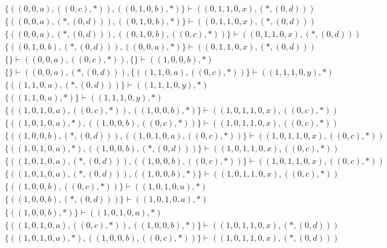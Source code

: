 \begin{align*}
	 & \qquad \{ ((0, 0, a), ((0, c), *)), ((0, 1, 0, b), *) \} \vdash ((0, 1, 1, 0, x), (*, (0, d))) \\ 
	 & \qquad \{ ((0, 0, a), (*, (0, d))), ((0, 1, 0, b), *) \} \vdash ((0, 1, 1, 0, x), (*, (0, d))) \\ 
	 & \qquad \{ ((0, 0, a), (*, (0, d))), ((0, 1, 0, b), ((0, c), *)) \} \vdash ((0, 1, 1, 0, x), (*, (0, d))) \\ 
	 & \qquad \{ ((0, 1, 0, b), (*, (0, d))), ((0, 0, a), *) \} \vdash ((0, 1, 1, 0, x), (*, (0, d))) \\ 
	 & \qquad \{  \} \vdash ((0, 0, a), ((0, c), *)), \{  \} \vdash ((1, 0, 0, b), *) \\ 
	 & \qquad \{  \} \vdash ((0, 0, a), (*, (0, d))), \{ ((1, 1, 0, a), ((0, c), *)) \} \vdash ((1, 1, 1, 0, y), *) \\ 
	 & \qquad \{ ((1, 1, 0, a), (*, (0, d))) \} \vdash ((1, 1, 1, 0, y), *) \\ 
	 & \qquad \{ ((1, 1, 0, a), *) \} \vdash ((1, 1, 1, 0, y), *) \\ 
	 & \qquad \{ ((1, 0, 1, 0, a), ((0, c), *)), ((1, 0, 0, b), *) \} \vdash ((1, 0, 1, 1, 0, x), ((0, c), *)) \\ 
	 & \qquad \{ ((1, 0, 1, 0, a), *), ((1, 0, 0, b), ((0, c), *)) \} \vdash ((1, 0, 1, 1, 0, x), ((0, c), *)) \\ 
	 & \qquad \{ ((1, 0, 0, b), (*, (0, d))), ((1, 0, 1, 0, a), ((0, c), *)) \} \vdash ((1, 0, 1, 1, 0, x), ((0, c), *)) \\ 
	 & \qquad \{ ((1, 0, 1, 0, a), *), ((1, 0, 0, b), (*, (0, d))) \} \vdash ((1, 0, 1, 1, 0, x), ((0, c), *)) \\ 
	 & \qquad \{ ((1, 0, 1, 0, a), (*, (0, d))), ((1, 0, 0, b), ((0, c), *)) \} \vdash ((1, 0, 1, 1, 0, x), ((0, c), *)) \\ 
	 & \qquad \{ ((1, 0, 1, 0, a), (*, (0, d))), ((1, 0, 0, b), *) \} \vdash ((1, 0, 1, 1, 0, x), ((0, c), *)) \\ 
	 & \qquad \{ ((1, 0, 0, b), ((0, c), *)) \} \vdash ((1, 0, 1, 0, a), *) \\ 
	 & \qquad \{ ((1, 0, 0, b), (*, (0, d))) \} \vdash ((1, 0, 1, 0, a), *) \\ 
	 & \qquad \{ ((1, 0, 0, b), *) \} \vdash ((1, 0, 1, 0, a), *) \\ 
	 & \qquad \{ ((1, 0, 1, 0, a), ((0, c), *)), ((1, 0, 0, b), *) \} \vdash ((1, 0, 1, 1, 0, x), (*, (0, d))) \\ 
	 & \qquad \{ ((1, 0, 1, 0, a), *), ((1, 0, 0, b), ((0, c), *)) \} \vdash ((1, 0, 1, 1, 0, x), (*, (0, d))) \\ 

\end{align*}
